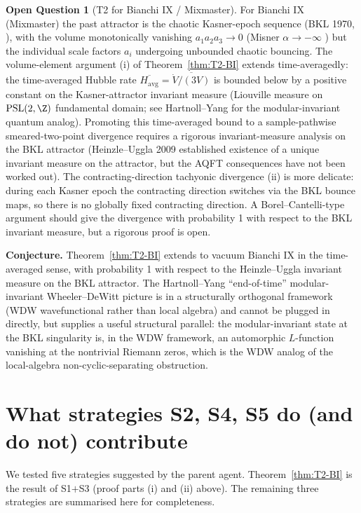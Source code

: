 \documentclass[11pt,a4paper]{article}
\theoremstyle{definition}
\newtheorem{question}[theorem]{Open Question}
\begin{document}
\begin{question}[T2 for Bianchi IX / Mixmaster]\label{q:T2-BIX}
For Bianchi IX (Mixmaster) the past attractor is the chaotic Kasner-epoch
sequence (BKL 1970, \cite{BKL1970}), with the volume monotonically
vanishing $a_1 a_2 a_3 \to 0$ (Misner $\alpha\to-\infty$
\cite{Misner1969}) but the individual scale factors $a_i$ undergoing
unbounded chaotic bouncing. The volume-element argument (i) of
Theorem~\ref{thm:T2-BI} extends time-averagedly: the time-averaged
Hubble rate $\overline{H_{\text{avg}}} = \overline{\dot V/(3V)}$
is bounded below by a positive constant on the Kasner-attractor
invariant measure (Liouville measure on $\mathrm{PSL}(2,\Z)$ fundamental
domain; see Hartnoll--Yang \cite{HartnollYang2025} for the
modular-invariant quantum analog). Promoting this time-averaged bound
to a sample-pathwise smeared-two-point divergence requires a rigorous
invariant-measure analysis on the BKL attractor (Heinzle--Uggla 2009
established existence of a unique invariant measure on the attractor,
but the AQFT consequences have not been worked out). The
contracting-direction tachyonic divergence (ii) is more delicate:
during each Kasner epoch the contracting direction switches via the BKL
bounce maps, so there is no globally fixed contracting direction. A
Borel--Cantelli-type argument should give the divergence with probability
1 with respect to the BKL invariant measure, but a rigorous proof is
open.

\textbf{Conjecture.} Theorem~\ref{thm:T2-BI} extends to vacuum Bianchi IX
in the time-averaged sense, with probability 1 with respect to the
Heinzle--Uggla invariant measure on the BKL attractor. The Hartnoll--Yang
\cite{HartnollYang2025} ``end-of-time'' modular-invariant
Wheeler--DeWitt picture is in a structurally orthogonal framework
(WDW wavefunctional rather than local algebra) and cannot be plugged in
directly, but supplies a useful structural parallel: the modular-invariant
state at the BKL singularity is, in the WDW framework, an automorphic
$L$-function vanishing at the nontrivial Riemann zeros, which is the
WDW analog of the local-algebra non-cyclic-separating obstruction.
\end{question}

\section{What strategies S2, S4, S5 do (and do not) contribute}

We tested five strategies suggested by the parent agent. Theorem~\ref{thm:T2-BI}
is the result of S1$+$S3 (proof parts (i) and (ii) above). The remaining
three strategies are summarised here for completeness.
\end{document}
